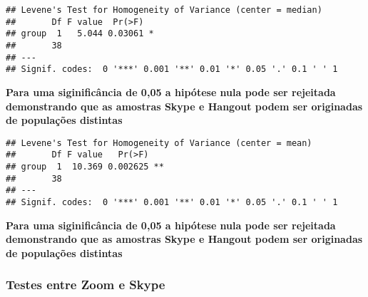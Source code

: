 \documentclass[
]{article}
\newenvironment{Shaded}{\begin{snugshade}}{\end{snugshade}}
\newcommand{\DataTypeTok}[1]{\textcolor[rgb]{0.13,0.29,0.53}{#1}}
\newcommand{\KeywordTok}[1]{\textcolor[rgb]{0.13,0.29,0.53}{\textbf{#1}}}
\newcommand{\NormalTok}[1]{#1}
\newcommand{\OperatorTok}[1]{\textcolor[rgb]{0.81,0.36,0.00}{\textbf{#1}}}
\newcommand{\StringTok}[1]{\textcolor[rgb]{0.31,0.60,0.02}{#1}}
\begin{document}
\begin{verbatim}
## Levene's Test for Homogeneity of Variance (center = median)
##       Df F value  Pr(>F)  
## group  1   5.044 0.03061 *
##       38                  
## ---
## Signif. codes:  0 '***' 0.001 '**' 0.01 '*' 0.05 '.' 0.1 ' ' 1
\end{verbatim}

\textbf{Para uma siginificância de 0,05 a hipótese nula pode ser
rejeitada demonstrando que as amostras Skype e Hangout podem ser
originadas de populações distintas}

\begin{Shaded}
\end{Shaded}

\begin{verbatim}
## Levene's Test for Homogeneity of Variance (center = mean)
##       Df F value   Pr(>F)   
## group  1  10.369 0.002625 **
##       38                    
## ---
## Signif. codes:  0 '***' 0.001 '**' 0.01 '*' 0.05 '.' 0.1 ' ' 1
\end{verbatim}

\textbf{Para uma siginificância de 0,05 a hipótese nula pode ser
rejeitada demonstrando que as amostras Skype e Hangout podem ser
originadas de populações distintas}

\hypertarget{testes-entre-zoom-e-skype}{%
\subsubsection{Testes entre Zoom e
Skype}\label{testes-entre-zoom-e-skype}}

\begin{Shaded}
\end{Shaded}
\end{document}
